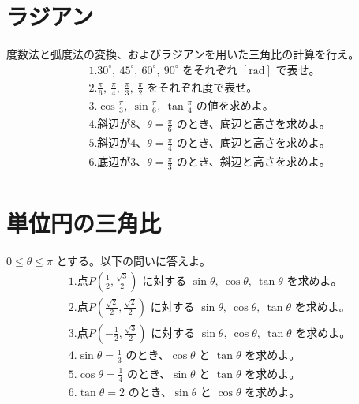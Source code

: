 \documentclass[paper=b4j,landscape,twocolumn,fleqn]{jlreq}
\begin{document}
\normalsize
\section{ラジアン}
度数法と弧度法の変換、およびラジアンを用いた三角比の計算を行え。
\begin{align*}
　&1.　30^\circ,\ 45^\circ,\ 60^\circ,\ 90^\circ\text{ をそれぞれ }[\mathrm{rad}]\text{ で表せ。}\\[0.45em]
　&2.　\frac{\pi}{6},\ \frac{\pi}{4},\ \frac{\pi}{3},\ \frac{\pi}{2}\text{ をそれぞれ度で表せ。}\\[0.45em]
　&3.　\cos \frac{\pi}{3},\ \sin \frac{\pi}{6},\ \tan \frac{\pi}{4}\text{ の値を求めよ。}\\[0.45em]
　&4.　斜辺が8、\theta=\frac{\pi}{6}\text{ のとき、底辺と高さを求めよ。}\\[0.45em]
　&5.　斜辺が4、\theta=\frac{\pi}{4}\text{ のとき、底辺と高さを求めよ。}\\[0.45em]
　&6.　底辺が3、\theta=\frac{\pi}{3}\text{ のとき、斜辺と高さを求めよ。}\\[0.45em]
\end{align*}


\section{単位円の三角比}
0$\leq\theta\leq\pi$ とする。以下の問いに答えよ。
\begin{align*}
　&1.　点P\left(\frac{1}{2},\frac{\sqrt{3}}{2}\right)\text{ に対する }\sin\theta,\ \cos\theta,\ \tan\theta\text{ を求めよ。}\\[0.45em]
　&2.　点P\left(\frac{\sqrt{2}}{2},\frac{\sqrt{2}}{2}\right)\text{ に対する }\sin\theta,\ \cos\theta,\ \tan\theta\text{ を求めよ。}\\[0.45em]
　&3.　点P\left(-\frac{1}{2},\frac{\sqrt{3}}{2}\right)\text{ に対する }\sin\theta,\ \cos\theta,\ \tan\theta\text{ を求めよ。}\\[0.45em]
　&4.　\sin\theta=\frac{1}{3}\text{ のとき、}\cos\theta\text{ と }\tan\theta\text{ を求めよ。}\\[0.45em]
　&5.　\cos\theta=\frac{1}{4}\text{ のとき、}\sin\theta\text{ と }\tan\theta\text{ を求めよ。}\\[0.45em]
　&6.　\tan\theta=2\text{ のとき、}\sin\theta\text{ と }\cos\theta\text{ を求めよ。}\\[0.45em]
\end{align*}
\end{document}

